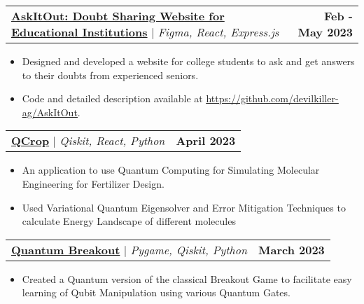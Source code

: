 \documentclass[letterpaper,11pt]{article}
\makeatletter
\newcommand{\resumeItem}[1]{
    \item\small{
        {#1 \vspace{-2pt}}
    }
}
\newcommand{\resumeProjectHeading}[2]{
    \item
    \begin{tabular*}{1.001\textwidth}{l@{\extracolsep{\fill}}r}
        \small#1 & \textbf{\small #2}\\
    \end{tabular*}\vspace{-7pt}
}
\newcommand{\resumeItemListStart}{\begin{itemize}}
\newcommand{\resumeItemListEnd}{\end{itemize}\vspace{-5pt}}
\makeatother
\begin{document}
        \resumeProjectHeading
            {\textbf{\href{https://askitout.vercel.app/}{AskItOut: Doubt Sharing Website for Educational Institutions}} $|$ \emph{Figma, React, Express.js}}{Feb - May 2023}
            \resumeItemListStart
                \resumeItem{Designed and developed a website for college students to ask and get answers to their doubts from experienced seniors.}
                \resumeItem{Code and detailed description available at \underline{{\href{https://github.com/devilkiller-ag/AskItOut}{https://github.com/devilkiller-ag/AskItOut}}}.}
            \resumeItemListEnd
            \vspace{-15pt}
            
            \resumeProjectHeading
                {\textbf{\href{https://github.com/devilkiller-ag/NYUAD-2023/tree/main/QCrop}{QCrop}} $|$ \emph{Qiskit, React, Python}}{April 2023}
                \resumeItemListStart
                  \resumeItem{An application to use Quantum Computing for Simulating Molecular Engineering for Fertilizer Design.}
                  \resumeItem{Used Variational Quantum Eigensolver and Error Mitigation Techniques to calculate Energy Landscape of different molecules}
                \resumeItemListEnd
                \vspace{-13pt}

        
        \resumeProjectHeading
        {\textbf{\href{https://github.com/devilkiller-ag/Quantum-Breakout}{Quantum Breakout}} $|$ \emph{Pygame, Qiskit, Python}}{March 2023}
        \resumeItemListStart
        \resumeItem{Created a Quantum version of the classical Breakout Game to facilitate easy learning of Qubit Manipulation using various Quantum Gates.}
        \resumeItemListEnd
        \vspace{-15pt}
        
        
\end{document}
